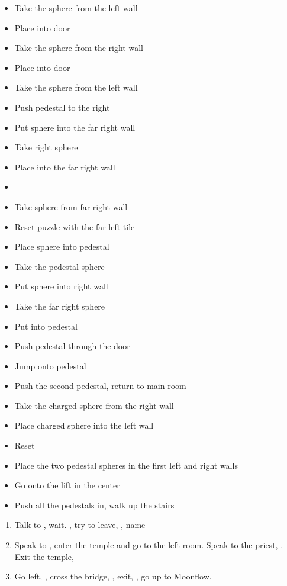 \begin{trial}
    \begin{itemize}
        \item Take the sphere from the left wall
        \item Place into door
        \item Take the sphere from the right wall
        \item Place into door
        \item Take the sphere from the left wall
        \item Push pedestal to the right
        \item Put sphere into the far right wall
        \item Take right sphere
        \item Place into the far right wall
        \item \cs
        \item Take sphere from far right wall
        \item Reset puzzle with the far left tile
        \item Place sphere into pedestal
        \item Take the pedestal sphere
        \item Put sphere into right wall
        \item Take the far right sphere
        \item Put into pedestal
        \item Push pedestal through the door
        \item Jump onto pedestal
        \item Push the second pedestal, return to main room
        \item Take the charged sphere from the right wall
        \item Place charged sphere into the left wall
        \item Reset
        \item Place the two pedestal spheres in the first left and right walls
        \item Go onto the lift in the center
        \item Push all the pedestals in, walk up the stairs
    \end{itemize}
\end{trial}
\begin{enumerate}[resume]
    \item Talk to \auron, wait. \sd, try to leave, \sd, name \ixion
    \item Speak to \auron, enter the temple and go to the left room. Speak to the priest, \sd. Exit the temple, \sd
    \item Go left, , cross the bridge, \sd, exit, \sd, go up to Moonflow.
\end{enumerate}